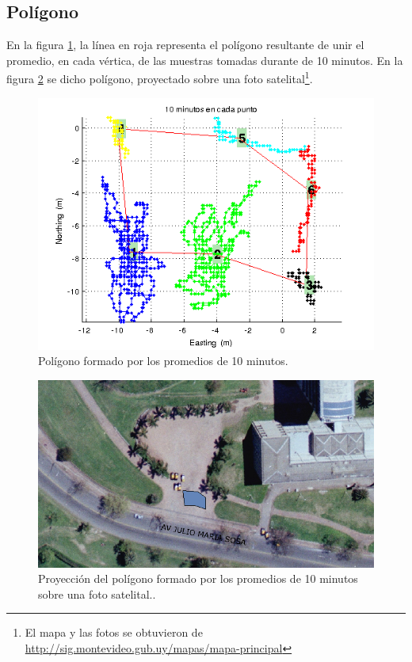 \documentclass[spanish,12pt,a4paper,titlepage]{report}
\begin{document}
\newpage
\subsection{Polígono}
\label{sec:gps2-poligono}

En la figura \ref{fig:10min_pol.png}, la línea en roja representa el polígono resultante de unir el promedio, en cada vértica, de las muestras tomadas durante de 10 minutos. En la figura \ref{fig:10m_mapa.png} se dicho polígono, proyectado sobre una foto satelital\footnote{El mapa y las fotos se obtuvieron de \url{http://sig.montevideo.gub.uy/mapas/mapa-principal}}.

\begin{figure}[h!]
  \centering
  \includegraphics[width=.8\textwidth]{./img/10min_pol.png}
  \caption{Polígono formado por los promedios de 10 minutos.}
  \label{fig:10min_pol.png}
\end{figure}

\begin{figure}[h!]
  \centering
  \includegraphics[width=.8\textwidth]{./img/10m_mapa.png}
  \caption{Proyección del polígono formado por los promedios de 10 minutos sobre una foto satelital..}
  \label{fig:10m_mapa.png}
\end{figure}
\end{document}
